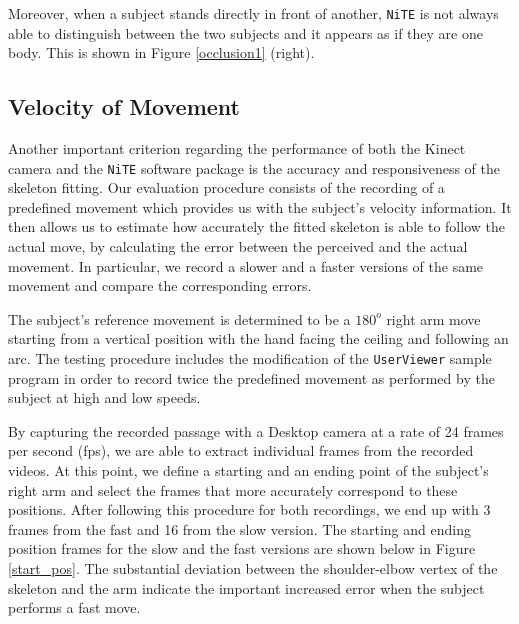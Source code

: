 \documentclass[11pt,a4paper]{article}
\begin{document}
\noindent
Moreover, when a subject stands directly in front of another, \texttt{NiTE} is not always able to distinguish between the two subjects and it appears as if they are one body. This is shown in Figure \ref{occlusion1} (right).

\subsection{Velocity of Movement}
Another important criterion regarding the performance of both the Kinect camera and the \texttt{NiTE} software package is the accuracy and responsiveness of the skeleton fitting. Our evaluation procedure consists of the recording of a predefined movement which provides us with the subject's velocity information. It then allows us to estimate how accurately the fitted skeleton is able to follow the actual move, by calculating the error between the perceived and the actual movement. In particular, we record a slower and a faster versions of the same movement and compare the corresponding errors.

\noindent
The subject's reference movement is determined to be a $180^o$ right arm move starting from a vertical position with the hand facing the ceiling and following an arc. The testing procedure includes the modification of the \texttt{UserViewer} sample program in order to record twice the predefined movement as performed by the subject at high and low speeds. 
 
\noindent
By capturing the recorded passage with a Desktop camera at a rate of 24 frames per second (fps), we are able to extract individual frames from the recorded videos. At this point, we define a starting and an ending point of the subject's right arm and select the frames that more accurately correspond to these positions. After following this procedure for both recordings, we end up with 3 frames from the fast and 16 from the slow version. The starting and ending position frames for the slow and the fast versions are shown below in Figure \ref{start_pos}. The substantial deviation between the shoulder-elbow vertex of the skeleton and the arm indicate the important increased error when the subject performs a fast move.
\end{document}
